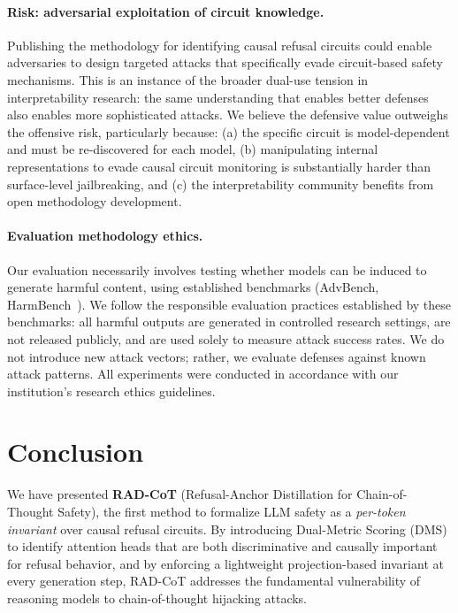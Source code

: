 \documentclass[11pt]{article}
\begin{document}
\paragraph{Risk: adversarial exploitation of circuit knowledge.}
Publishing the methodology for identifying causal refusal circuits could enable adversaries to design targeted attacks that specifically evade circuit-based safety mechanisms. This is an instance of the broader dual-use tension in interpretability research: the same understanding that enables better defenses also enables more sophisticated attacks. We believe the defensive value outweighs the offensive risk, particularly because: (a) the specific circuit is model-dependent and must be re-discovered for each model, (b) manipulating internal representations to evade causal circuit monitoring is substantially harder than surface-level jailbreaking, and (c) the interpretability community benefits from open methodology development.

\paragraph{Evaluation methodology ethics.}
Our evaluation necessarily involves testing whether models can be induced to generate harmful content, using established benchmarks (AdvBench, HarmBench~\citep{mazeika2024harmbench}). We follow the responsible evaluation practices established by these benchmarks: all harmful outputs are generated in controlled research settings, are not released publicly, and are used solely to measure attack success rates. We do not introduce new attack vectors; rather, we evaluate defenses against known attack patterns. All experiments were conducted in accordance with our institution's research ethics guidelines.



\section{Conclusion}
\label{sec:conclusion}

We have presented \textbf{RAD-CoT} (Refusal-Anchor Distillation for Chain-of-Thought Safety), the first method to formalize LLM safety as a \emph{per-token invariant} over causal refusal circuits. By introducing Dual-Metric Scoring (DMS) to identify attention heads that are both discriminative and causally important for refusal behavior, and by enforcing a lightweight projection-based invariant at every generation step, RAD-CoT addresses the fundamental vulnerability of reasoning models to chain-of-thought hijacking attacks.
\end{document}
